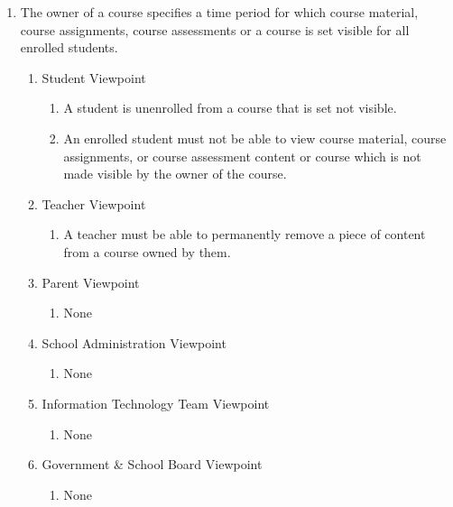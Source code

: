 \documentclass[]{article}
\begin{document}
\begin{enumerate}[{BE}1.]
	\item The owner of a course specifies a time period for which course material, course assignments, course assessments or a course is set visible for all enrolled students.
	\begin{enumerate}[{VP2}.1]
		\item Student Viewpoint
			\begin{enumerate}
				\item A student is unenrolled from a course that is set not visible.
				\item An enrolled student must not be able to view course material, course assignments, or course assessment content or course which is not made visible by the owner of the course.
			\end{enumerate}
		\item Teacher Viewpoint
			\begin{enumerate}
				\item A teacher must be able to permanently remove a piece of content from a course owned by them.
			\end{enumerate}
		\item Parent Viewpoint
			\begin{enumerate}
				\item None
			\end{enumerate}
		\item School Administration Viewpoint
			\begin{enumerate}
				\item None
			\end{enumerate}
		\item Information Technology Team Viewpoint
			\begin{enumerate}
				\item None
			\end{enumerate}
		\item Government \& School Board Viewpoint
			\begin{enumerate}
				\item None
			\end{enumerate}
	\end{enumerate}



\end{enumerate}
\end{document}
